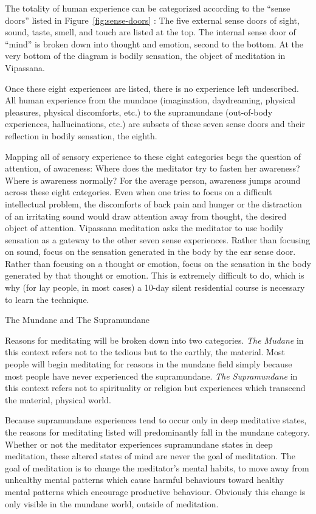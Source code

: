 \documentclass{article}
\begin{document}
The totality of human experience can be categorized according to the ``sense doors''
listed in Figure~\ref{fig:sense-doors} \cite{sense-icons}: The five external sense doors of sight, sound,
taste, smell, and touch are listed at the top. The internal sense door of ``mind'' is
broken down into thought and emotion, second to the bottom. At the very bottom of the
diagram is bodily sensation, the object of meditation in Vipassana.

Once these eight experiences are listed, there is no experience left undescribed. All
human experience from the mundane (imagination, daydreaming, physical pleasures,
physical discomforts, etc.) to the supramundane (out-of-body experiences,
hallucinations, etc.) are subsets of these seven sense doors and their reflection in
bodily sensation, the eighth.

Mapping all of sensory experience to these eight categories begs the question of
attention, of awareness: Where does the meditator try to fasten her awareness? Where
is awareness normally? For the average person, awareness jumps around across these
eight categories. Even when one tries to focus on a difficult intellectual problem,
the discomforts of back pain and hunger or the distraction of an irritating sound
would draw attention away from thought, the desired object of attention. Vipassana
meditation asks the meditator to use bodily sensation as a gateway to the other seven
sense experiences. Rather than focusing on sound, focus on the sensation generated in
the body by the ear sense door. Rather than focusing on a thought or emotion, focus
on the sensation in the body generated by that thought or emotion. This is extremely
difficult to do, which is why (for lay people, in most cases) a 10-day silent
residential course \cite{dhamma} is necessary to learn the technique.

\begin{center}
  \Huge{The Mundane and The Supramundane}
\end{center}

Reasons for meditating will be broken down into two categories. \textit{The Mudane}
in this context refers not to the tedious but to the earthly, the material. Most people will begin
meditating for reasons in the mundane field simply because most people have never
experienced the supramundane. \textit{The Supramundane} in this context refers not to
spirituality or religion but experiences which transcend the material, physical
world.

Because supramundane experiences tend to occur only in deep meditative states,
the reasons for meditating listed will predominantly fall in the mundane
category. Whether or not the meditator experiences supramundane states in deep
meditation, these altered states of mind are never the goal of meditation. The goal
of meditation is to change the meditator's mental habits, to move away from unhealthy
mental patterns which cause harmful behaviours toward healthy mental patterns which
encourage productive behaviour. Obviously this change is only visible in the mundane
world, outside of meditation.
\end{document}
